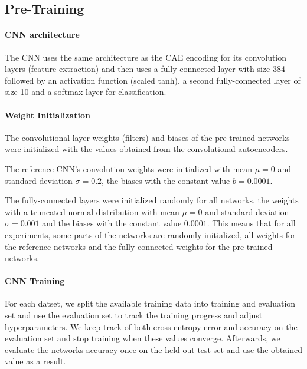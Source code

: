 \documentclass{article}
\begin{document}
  \subsection{Pre-Training}

    \paragraph{CNN architecture} The CNN uses the same architecture as the CAE encoding for its convolution layers (feature extraction) and then uses a fully-connected layer with size 384 followed by an activation function (scaled tanh), a second fully-connected layer of size 10 and a softmax layer for classification. 

    \paragraph{Weight Initialization}

    The convolutional layer weights (filters) and biases of the pre-trained networks were initialized with the values obtained from the convolutional autoencoders.

    The reference CNN's convolution weights were initialized with mean $\mu = 0 $ and standard deviation $\sigma = 0.2$, the biases with the constant value $b =  0.0001$.

    The fully-connected layers were initialized randomly for all networks, the weights with a truncated normal distribution with mean $\mu = 0$ and standard deviation $\sigma = 0.001$ and the biases with the constant value $0.0001$.
    This means that for all experiments, some parts of the networks are randomly initialized, all weights for the reference networks and the fully-connected weights for the pre-trained networks. 

    \paragraph{CNN Training}
    For each datset, we split the available training data into training and evaluation set and use the evaluation set to track the training progress and adjust hyperparameters. We keep track of both cross-entropy error and accuracy on the evaluation set and stop training when these values converge. Afterwards, we evaluate the networks accuracy once on the held-out test set and use the obtained value as a result. 
\end{document}
